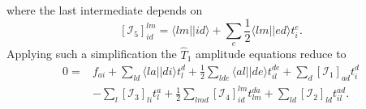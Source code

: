 where the last intermediate depends on
\begin{equation}
\left[ \mathcal{I}_5 \right]_{id}^{lm} = \langle lm||id \rangle +\sum_e  \frac{1}{2} \langle lm||ed \rangle t_i^e .
\end{equation}
Applying such a simplification the $\hat{T}_1$ amplitude equations reduce to
\begin{equation}
\label{eq:CC:t1eq}
\begin{split}
0 =& f_{ai}
 + \sum_{ld}  \langle la||di \rangle t_l^d  + \frac{1}{2} \sum_{lde} \langle al||de \rangle t_{il}^{de} 
+ \sum_d  \left[\mathcal{I}_1\right]_{ad}  t_i^d   
\\
&- \sum_l \left[\mathcal{I}_3\right]_{li} t_l^a 
+ \frac{1}{2} \sum_{lmd} \left[\mathcal{I}_4\right]_{id}^{lm} t_{lm}^{da}
+ \sum_{ld} \left[\mathcal{I}_2\right]_{ld} t_{il}^{ad} .
\end{split}
\end{equation}


